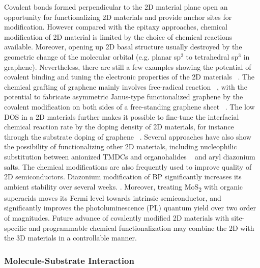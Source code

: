 Covalent bonds formed perpendicular to the 2D material plane open an
opportunity for functionalizing 2D materials and provide anchor sites
for modification. However compared with the epitaxy approaches,
chemical modification of 2D material is limited by the choice of
chemical reactions available. Moreover, opening up 2D basal structure
usually destroyed by the geometric change of the molecular orbital
(e.g. planar sp\(^{\text{2}}\) to tetrahedral sp\(^{\text{3}}\) in
graphene). Nevertheless, there are still a few examples showing the
potential of covalent binding and tuning the electronic properties of
the 2D materials
~\cite{Georgakilas_2012_noncoval_gr_rev,Lee_2011_tempo_gr,Zhang_2013_janus_gr,Voiry_2014_cov_TMDC_phase,Vishnoi_2016_ar_mos2_covalent,Liu_2011_rev_chem_dope_gr,Wang_2012_ar_gr_react_rate}.
%
The chemical grafting of graphene mainly involves free-radical
reaction
~\cite{Lee_2011_tempo_gr,Choi_2010_aminotempo_gr,Zhang_2013_janus_gr,Wang_2012_ar_gr_react_rate,Kumar_2014_2D_MOF_gr},
%
with the potential to fabricate asymmetric Janus-type functionalized
graphene by the covalent modification on both sides of a free-standing
graphene sheet ~\cite{Zhang_2013_janus_gr}. The low DOS in a 2D
materials further makes it possible to fine-tune the interfacial
chemical reaction rate by the doping density of 2D materials, for
instance through the substrate doping of graphene
~\cite{Wang_2012_ar_gr_react_rate}. Several approaches have also show
the possibility of functionalizing other 2D materials, including
nucleophilic substitution between anionized TMDCs and organohalides
~\cite{Vishnoi_2016_ar_mos2_covalent} and aryl diazonium
salts.  The chemical modifications are also
frequently used to improve quality of 2D semiconductors.
%
Diazonium modification of BP significantly increases its ambient
stability over several weeks. . Moreover, treating MoS\textsubscript{2} with organic
super\-acids moves its Fermi level towards intrinsic semiconductor,
and significantly improves the photo\-luminescence (PL) quantum yield over two order of magnitudes. 
%
Future advance of covalently
modified 2D materials with site-specific and programmable chemical
functionalization may combine the 2D with the 3D materials in a
controllable manner.

\subsubsection{Molecule-Substrate Interaction}
\label{sec:intro-mol-subst}

